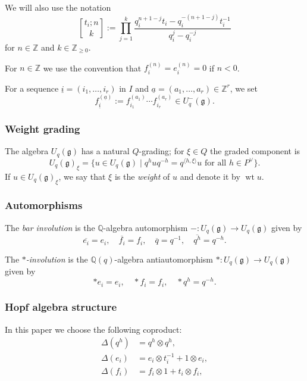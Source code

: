 \documentclass[final]{amsart}
\theoremstyle{plain}
\theoremstyle{definition}
\newcommand{\qbinom}{\genfrac{[}{]}{0pt}{}}
\newcommand{\bbQ}{\mathbb Q}
\newcommand{\bbZ}{\mathbb Z}
\newcommand{\frakg}{\mathfrak g}
\newcommand{\ula}{{\underline a}}
\newcommand{\uli}{{\underline i}}
\DeclareMathOperator{\weight}{wt}
\begin{document}
We will also use the notation
\begin{equation}
    \qbinom{t_i; n}{k} := \prod_{j=1}^k \frac{q_i^{n+1-j} t_i - q_i^{-(n+1-j)} t_i^{-1}}{q_i^j - q_i^{-j}}
\end{equation}
for $n\in \bbZ$ and $k\in \bbZ_{\ge0}$.

For $n\in \bbZ$ we use the convention that $f_i^{(n)} = e_i^{(n)} = 0$ if $n < 0$.

For a sequence $\uli = (i_1, \dots, i_r)$ in $I$ and $\ula = (a_1, \dots, a_r) \in \bbZ^r$, we set
\begin{equation}
    f_\uli^{(\ula)} := f_{i_1}^{(a_1)} \cdots f_{i_r}^{(a_r)} \in U_q^-(\frakg).
\end{equation}

\subsubsection*{Weight grading}
The algebra $U_q(\frakg)$ has a natural $Q$-grading; for $\xi \in Q$ the graded component is
\[
    U_q(\frakg)_\xi = \{ u \in U_q(\frakg) \mid q^h u q^{-h} = q^{\langle h, \xi\rangle} u \text{ for all } h \in P^\vee \}.
\]
If $u \in U_q(\frakg)_\xi$, we say that $\xi$ is the \emph{weight} of $u$ and denote it by $\weight u$.

\subsubsection*{Automorphisms}

The \emph{bar involution} is the $\bbQ$-algebra automorphism $-\colon U_q(\frakg) \to U_q(\frakg)$ given by
\begin{equation}
    \overline{e_i} = e_i,\quad \overline{f_i} = f_i,\quad \overline{q}= q^{-1},\quad \overline{q^h} = q^{-h}.
\end{equation}

The \emph{$*$-involution} is the $\bbQ(q)$-algebra antiautomorphism $*\colon U_q(\frakg) \to U_q(\frakg)$ given by
\begin{equation}
    *e_i = e_i,\quad *f_i = f_i,\quad *q^h = q^{-h}.
\end{equation}

\subsubsection*{Hopf algebra structure}

In this paper we choose the following coproduct:
\begin{equation}
    \label{equation:coproduct}
    \begin{aligned}
        \Delta(q^h) &= q^h \otimes q^h,\\
        \Delta(e_i) &= e_i\otimes t_i^{-1} + 1\otimes e_i, \\
        \Delta(f_i) &= f_i\otimes 1 + t_i\otimes f_i,
    \end{aligned}
\end{equation}
\end{document}
